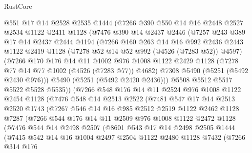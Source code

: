 \begin{lexlean}{RustCore}
\begin{coremodule}
    @551
    @17
    @14
    @2528
    @2535
    @1444
    (@7266
      @390
      @550
      @14
      @16
      @2448
      @2527
      @2534
      @1122
      @2411
      @1128
      (@7476
        @390
        @14
        @2437
        @2446
        (@7257
          @243
          @389
          @17
          @14
          @2437
          @2444
          @1194
          (@7266
            @160
            @263
            @14
            @16
            @992
            @2436
            @2443
            @1122
            @2419
            @1128
            (@7278 @52 @14 @52 @992 (@4526 (@7283 @52)) @4597)
            (@7266
              @170
              @176
              @14
              @11
              @1002
              @976
              @1008
              @1122
              @2429
              @1128
              (@7278 @77 @14 @77 @1002 (@4526 (@7283 @77)) @4682)
              @7308
              @5490
              (@5251 (@5492 @2430 @976)))
            @5490
            (@5251 (@5492 @2420 @2436)))
          @5508
          @5512
          @5517
          @5522
          @5528
          @5535))
      (@7266
        @548
        @176
        @14
        @11
        @2524
        @976
        @1008
        @1122
        @2454
        @1128
        (@7476
          @548
          @14
          @2513
          @2522
          (@7481
            @547
            @17
            @14
            @2513
            @2520
            @1743
            (@7267
              @546
              @14
              @16
              @985
              @2512
              @2519
              @1122
              @2462
              @1128
              @7287
              (@7266
                @544
                @176
                @14
                @11
                @2509
                @976
                @1008
                @1122
                @2472
                @1128
                (@7476
                  @544
                  @14
                  @2498
                  @2507
                  (@8601
                    @543
                    @17
                    @14
                    @2498
                    @2505
                    @1444
                    (@7415
                      @542
                      @14
                      @16
                      @1004
                      @2497
                      @2504
                      @1122
                      @2480
                      @1128
                      @7432
                      (@7266
                        @314
                        @176

\end{coremodule}
\end{lexlean}
